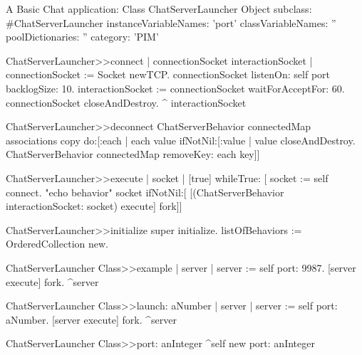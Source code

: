 \documentclass[a4paper,10pt,twoside]{book}
\begin{document}
\begin{script}{A Basic Chat application: Class ChatServerLauncher}
Object subclass: #ChatServerLauncher
	instanceVariableNames: 'port'
	classVariableNames: ''
	poolDictionaries: ''
	category: 'PIM'

ChatServerLauncher>>connect
	| connectionSocket interactionSocket |
	connectionSocket := Socket newTCP.
	connectionSocket listenOn: self port backlogSize: 10.
	interactionSocket := connectionSocket waitForAcceptFor: 60.
	connectionSocket closeAndDestroy.
	^ interactionSocket

ChatServerLauncher>>deconnect
	ChatServerBehavior connectedMap associations copy do:[:each |
		each value ifNotNil:[:value |
			value closeAndDestroy.
			ChatServerBehavior connectedMap removeKey: each key]]


ChatServerLauncher>>execute
	| socket |
	[true]
		whileTrue: [
			socket := self connect.
			"echo behavior"
			socket ifNotNil:[
				[(ChatServerBehavior interactionSocket: socket) execute] fork]]


ChatServerLauncher>>initialize
	super initialize.
	listOfBehaviors := OrderedCollection new.

ChatServerLauncher Class>>example
	| server |
	server := self port: 9987.
	[server execute] fork.
	^server

ChatServerLauncher Class>>launch: aNumber
	| server |
	server := self port: aNumber.
	[server execute] fork.
	^server

ChatServerLauncher Class>>port: anInteger
	^self new port: anInteger

\end{script}
\end{document}
